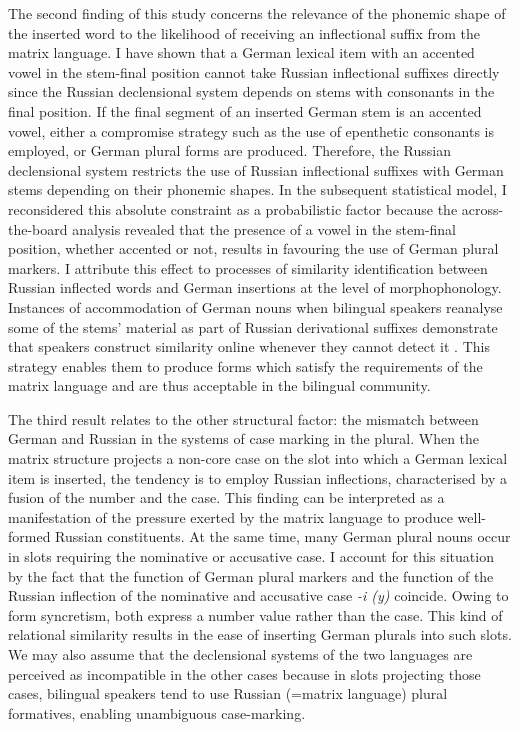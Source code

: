 The second finding of this study concerns the relevance of the phonemic shape of the inserted word to the likelihood of receiving an inflectional suffix from the matrix language. I have shown that a German lexical item with an accented vowel in the stem-final position cannot take Russian inflectional suffixes directly since the Russian declensional system depends on stems with consonants in the final position. If the final segment of an inserted German stem is an accented vowel, either a compromise strategy such as the use of epenthetic consonants is employed, or German plural forms are produced. Therefore, the Russian declensional system restricts the use of Russian inflectional suffixes with German stems depending on their phonemic shapes. In the subsequent statistical model, I reconsidered this absolute constraint as a probabilistic factor because the across-the-board analysis revealed that the presence of a vowel in the stem-final position, whether accented or not, results in favouring the use of German plural markers. I attribute this effect to processes of similarity identification between Russian inflected words and German insertions at the level of morphophonology. Instances of accommodation of German nouns when bilingual speakers reanalyse some of the stems' material as part of Russian derivational suffixes demonstrate that speakers construct similarity online whenever they cannot detect it \citep[cf.][]{hakimov-backus-20-intro}. This strategy enables them to produce forms which satisfy the requirements of the matrix language and are thus acceptable in the bilingual community.

The third result relates to the other structural factor: the mismatch between German and Russian in the systems of case marking in the plural. When the matrix structure projects a non-core case on the slot into which a German lexical item is inserted, the tendency is to employ Russian inflections, characterised by a fusion of the number and the case. This finding can be interpreted as a manifestation of the pressure exerted by the matrix language to produce well-formed Russian constituents. At the same time, many German plural nouns occur in slots requiring the nominative or accusative case. I account for this situation by the fact that the function of German plural markers and the function of the Russian inflection of the nominative and accusative case \textit{-i (y)} coincide. Owing to form syncretism, both express a number value rather than the case. This kind of relational similarity results in the ease of inserting German plurals into such slots. We may also assume that the declensional systems of the two languages are perceived as incompatible in the other cases because in slots projecting those cases, bilingual speakers tend to use Russian (=matrix language) plural formatives, enabling unambiguous case-marking.

